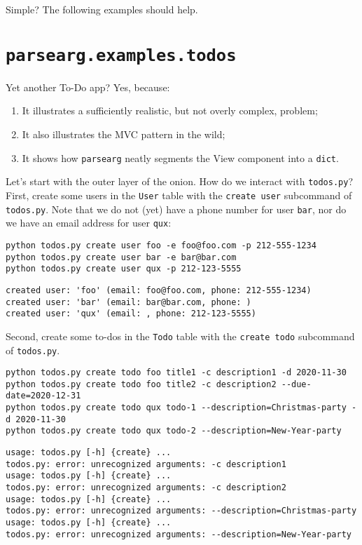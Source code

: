 \documentclass[10pt]{amsart}
\numberwithin{equation}{section}
\begin{document}
Simple? The following examples should help.

\section{\texttt{parsearg.examples.todos}}
\label{sec:org40ee003}
Yet another To-Do app? Yes, because:

\begin{enumerate}
\item It illustrates a  sufficiently realistic, but not overly complex, problem;
\item It also illustrates the MVC pattern in the wild;
\item It shows how \texttt{parsearg} neatly segments the View component into a \texttt{dict}.
\end{enumerate}

Let's start with the outer layer of the onion. How do we interact with \texttt{todos.py}?
First, create some users in the \texttt{User} table with the \texttt{create user} subcommand of \texttt{todos.py}. 
Note that we do not (yet) have a phone number for user \texttt{bar}, nor do we have an email address
for user \texttt{qux}:
\begin{verbatim}
python todos.py create user foo -e foo@foo.com -p 212-555-1234
python todos.py create user bar -e bar@bar.com
python todos.py create user qux -p 212-123-5555
\end{verbatim}

\begin{verbatim}
created user: 'foo' (email: foo@foo.com, phone: 212-555-1234)
created user: 'bar' (email: bar@bar.com, phone: )
created user: 'qux' (email: , phone: 212-123-5555)
\end{verbatim}


Second, create some to-dos in the \texttt{Todo} table with the \texttt{create todo} subcommand of \texttt{todos.py}. 
\begin{verbatim}
python todos.py create todo foo title1 -c description1 -d 2020-11-30
python todos.py create todo foo title2 -c description2 --due-date=2020-12-31
python todos.py create todo qux todo-1 --description=Christmas-party -d 2020-11-30
python todos.py create todo qux todo-2 --description=New-Year-party
\end{verbatim}

\begin{verbatim}
usage: todos.py [-h] {create} ...
todos.py: error: unrecognized arguments: -c description1
usage: todos.py [-h] {create} ...
todos.py: error: unrecognized arguments: -c description2
usage: todos.py [-h] {create} ...
todos.py: error: unrecognized arguments: --description=Christmas-party
usage: todos.py [-h] {create} ...
todos.py: error: unrecognized arguments: --description=New-Year-party
\end{verbatim}
\end{document}
